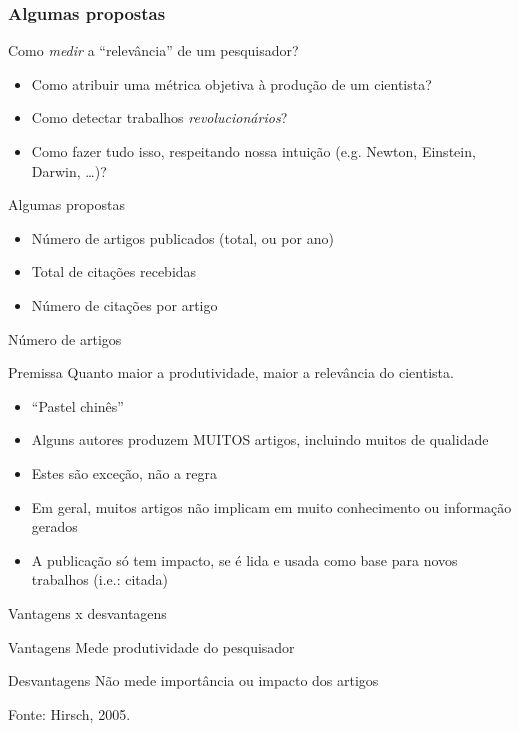 \documentclass{beamer}
\begin{document}
\subsubsection{Algumas propostas}

\begin{frame}{Como {\em medir} a ``relevância'' de um pesquisador?}
  \begin{itemize}
  \item Como atribuir uma métrica objetiva à produção de um cientista?
  \item Como detectar trabalhos {\em revolucionários}?
  \item Como fazer tudo isso, respeitando nossa intuição (e.g. Newton, Einstein, Darwin, \ldots)?
  \end{itemize}
\end{frame}

\begin{frame}{Algumas propostas}
  \begin{itemize}
  \item Número de artigos publicados (total, ou por ano)
  \item Total de citações recebidas
  \item Número de citações por artigo
  \end{itemize}
\end{frame}

\begin{frame}{Número de artigos}
  \begin{block}{Premissa}
    Quanto maior a produtividade, maior a relevância do cientista.
  \end{block}
  \begin{itemize}
  \item ``Pastel chinês''
  \item Alguns autores produzem MUITOS artigos, incluindo muitos de qualidade
  \item Estes são exceção, não a regra
  \item Em geral, muitos artigos não implicam em muito conhecimento ou informação gerados
  \item A publicação só tem impacto, se é lida e usada como base para novos trabalhos (i.e.: \alert{citada})
  \end{itemize}
\end{frame}

\begin{frame}{Vantagens x desvantagens}
  \begin{block}{Vantagens}
    Mede produtividade do pesquisador
  \end{block}
  \begin{block}{Desvantagens}
    Não mede importância ou impacto dos artigos
  \end{block}

\vfill
Fonte: Hirsch, 2005.
\end{frame}
\end{document}
